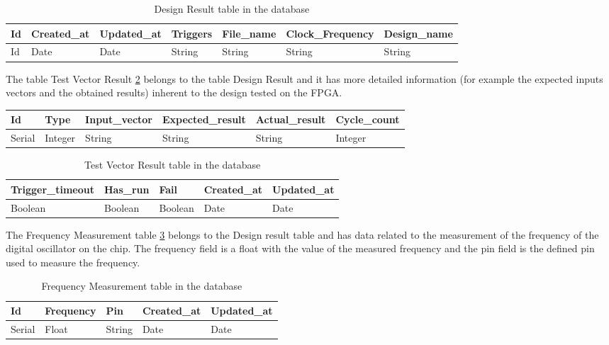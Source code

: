 \begin{table}[h!]
\centering
    \begin{tabular}{ | l | l | l | l | l | l | l |}
    \hline
    Id & Created\_at & Updated\_at & Triggers & File\_name & Clock\_Frequency & Design\_name  \\ \hline
    Id & Date & Date & String & String & String & String \\ \hline
    \end{tabular}
    \caption{Design Result table in the database}
    \label{tab:design_result_table}
\end{table}

The table Test Vector Result \ref{tab:Test_vector_result_table} belongs to the table Design Result and it has more detailed information (for example the expected inputs vectors and the obtained results) inherent to the design tested on the FPGA.

\begin{table}[h!]
\centering
    \begin{tabular}{ | l | l | l | l | l | l | }
    \hline
    Id & Type & Input\_vector & Expected\_result & Actual\_result & Cycle\_count\\ \hline
    Serial & Integer & String & String & String & Integer \\ \hline
    \end{tabular}
\end{table}

\begin{table}[h!]
\centering
    \begin{tabular}{ | l | l | l | l | l |}
	\hline
       Trigger\_timeout & Has\_run & Fail & Created\_at & Updated\_at\\ \hline
       Boolean & Boolean & Boolean & Date & Date\\ \hline
    \end{tabular}
    \caption{Test Vector Result table in the database}
    \label{tab:Test_vector_result_table}
\end{table}

The Frequency Measurement table \ref{tab:Frequency_measurement_table} belongs to the Design result table and has data related to the measurement of the frequency of the digital
oscillator on the chip. The frequency field is a float with the value of the measured frequency and the pin field is the defined pin used to measure the frequency.

\begin{table}[h!]
\centering
    \begin{tabular}{| l | l | l | l | l |}
	\hline
       Id & Frequency & Pin & Created\_at & Updated\_at\\ \hline
       Serial & Float & String & Date & Date\\ \hline
    \end{tabular}
    \caption{Frequency Measurement table in the database}
    \label{tab:Frequency_measurement_table}
\end{table}

